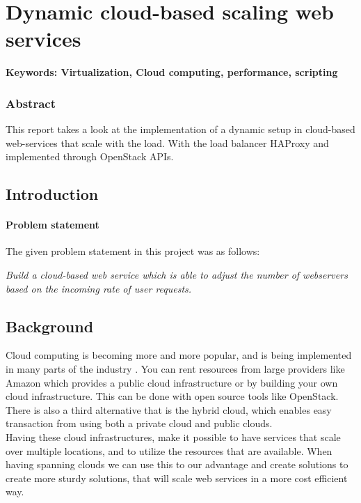 \chapter{Dynamic cloud-based scaling web services}
\textbf{Keywords: Virtualization, Cloud computing, performance, scripting}

\subsection*{Abstract}

This report takes a look at the implementation of a dynamic setup in cloud-based
web-services that scale with the load. With the load balancer HAProxy and
implemented through OpenStack APIs.

\section{Introduction}

\subsubsection{Problem statement}

The given problem statement in this project was as follows:

\emph{Build a cloud-based web service which is able to adjust the number of
webservers based on the incoming rate of user requests.}

\section{Background}
Cloud computing is becoming more and more popular, and is being implemented
in many parts of the industry \cite{OpenStack:Users}. You can rent resources 
from large providers like Amazon which provides a public cloud infrastructure 
or by building your own cloud infrastructure. This can be done with open source 
tools like OpenStack. There is also a third alternative that is the hybrid cloud,
which enables easy transaction from using both a private cloud and public clouds.\\

Having these cloud infrastructures, make it possible to have services
that scale over multiple locations, and to utilize the resources that are
available. When having spanning clouds we can use this to our advantage 
and create solutions to create more sturdy solutions, that will scale web
services in a more cost efficient way.\\

